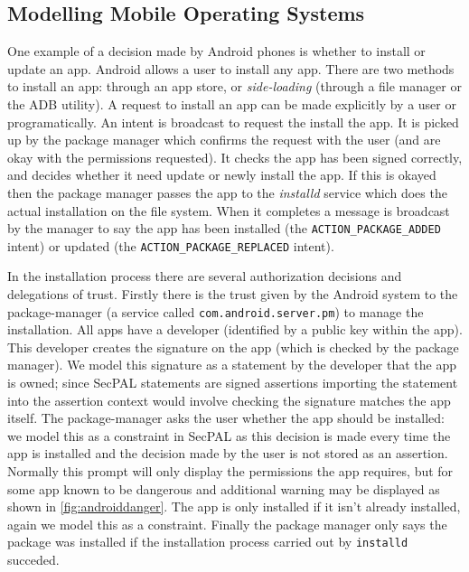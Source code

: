 \documentclass[a4paper,sfsidenotes]{%
  scrartcl%
}
\begin{document}
\subsection{Modelling Mobile Operating Systems}
\label{sec:modellingmobileos}

One example of a decision made by Android phones is whether to install or update
an app.  Android allows a user to install any app.  There are two methods to
install an app: through an app store, or \emph{side-loading} (through a file
manager or the \ac{ADB} utility).  A request to install an app can be made
explicitly by a user or programatically.  An intent is broadcast to request the
install the app.  It is picked up by the package manager which confirms the
request with the user (and are okay with the permissions requested). It checks the
app has been signed correctly, and decides whether it need update or newly install
the app.  If this is okayed then the package manager passes the app to the
\emph{installd} service which does the actual installation on the file system.
When it completes a message is broadcast by the manager to say the app has
been installed (the \texttt{ACTION\_PACKAGE\_ADDED} intent) or updated (the
\texttt{ACTION\_PACKAGE\_REPLACED} intent).

In the installation process there are several authorization decisions and
delegations of trust.  Firstly there is the trust given by the Android system to
the package-manager (a service called \texttt{com.android.server.pm}) to manage
the installation.  All apps have a developer (identified by a public key within
the app).  This developer creates the signature on the app (which is checked by
the package manager).  We model this signature as a statement by the developer
that the app is owned; since SecPAL statements are signed assertions importing
the statement into the assertion context would involve checking the signature
matches the app itself.  The package-manager asks the user whether the app
should be installed: we model this as a constraint in SecPAL as this decision is
made every time the app is installed and the decision made by the user is not
stored as an assertion. Normally this prompt will only display the permissions
the app requires, but for some app known to be dangerous and additional warning
may be displayed as shown in \autoref{fig:androiddanger}. The app is only installed if it isn't already
installed, again we model this as a constraint.  Finally the package manager
only says the package was installed if the installation process carried out by
\texttt{installd} succeded. 
\end{document}
